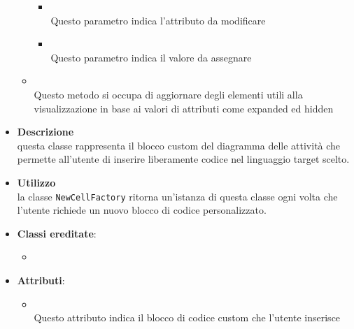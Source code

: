 \begin{itemize}
\begin{itemize}
\begin{itemize}
\item {}
\\ Questo parametro indica l'attributo da modificare
\item {}
\\ Questo parametro indica il valore da assegnare
\end{itemize}
\item {}
\\ Questo metodo si occupa di aggiornare degli elementi utili alla visualizzazione in base ai valori di attributi come expanded ed hidden
\end{itemize}
\end{itemize}

\label{\nogloxy{swedesigner::client::model::celltypes::activity::HxCustom}}
\begin{itemize}
\item \textbf{Descrizione}\\
questa classe rappresenta il blocco custom del diagramma delle attività che permette all'utente di inserire liberamente codice nel linguaggio target scelto.
\item \textbf{Utilizzo}\\
la classe \texttt{NewCellFactory} ritorna un'istanza di questa classe ogni volta che l'utente richiede un nuovo blocco di codice personalizzato.
\item \textbf{Classi ereditate}:
\begin{itemize}
\item \hyperref[\nogloxy{swedesigner::client::model::celltypes::activity::ActivityDiagramElement}]{}
\end{itemize}
\item \textbf{Attributi}:
\begin{itemize}
\item {}
\\ Questo attributo indica il blocco di codice custom che l'utente inserisce
\end{itemize}
\end{itemize}

